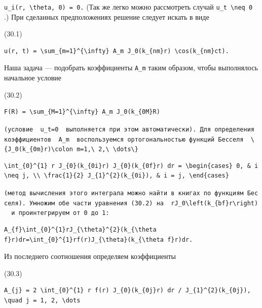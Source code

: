 \documentclass[
  ukrainian,
]{article}
\begin{document}
\texttt{u\_i(r,\ \textbackslash{}theta,\ 0)\ =\ 0.} (Так же легко можно
рассмотреть случай \texttt{u\_t\ \textbackslash{}neq\ 0} .) При
сделанных предположениях решение следует искать в виде

(30.1)

\begin{verbatim}
u(r, t) = \sum_{m=1}^{\infty} A_m J_0(k_{nm}r) \cos(k_{nm}ct).
\end{verbatim}

Наша задача --- подобрать коэффициенты \texttt{A\_m} таким образом,
чтобы выполнялось начальное условие

(30.2)

\begin{verbatim}
F(R) = \sum_{M=1}^{\infty} A_m J_0(k_{0M}R)
\end{verbatim}

\texttt{(условие\ \ \textquotesingle{}u\_t=0\textquotesingle{}\ \ выполняется\ при\ этом\ автоматически).\ Для\ определения\ коэффициентов\ \ \textquotesingle{}A\_m\textquotesingle{}\ \ воспользуемся\ ортогональностью\ функций\ Бесселя\ \ \textquotesingle{}\textbackslash{}\{J\_0(k\_\{0m\}r)\textbackslash{}colon\ m=1,\textbackslash{}\ 2,\textbackslash{}\ \textbackslash{}dots\textbackslash{}\}\textquotesingle{}}

\begin{verbatim}
\int_{0}^{1} r J_{0}(k_{0i}r) J_{0}(k_{0f}r) dr = \begin{cases} 0, & i \neq j, \\ \frac{1}{2} J_{1}^{2}(k_{0i}), & i = j, \end{cases}
\end{verbatim}

\texttt{(метод\ вычисления\ этого\ интеграла\ можно\ найти\ в\ книгах\ по\ функциям\ Бесселя).\ Умножим\ обе\ части\ уравнения\ (30.2)\ на\ \ \textquotesingle{}rJ\_0\textbackslash{}left(k\_\{bf\}r\textbackslash{}right)\textquotesingle{}\ \ и\ проинтегрируем\ от\ 0\ до\ 1:}

\begin{verbatim}
A_{f}\int_{0}^{1}rJ_{\theta}^{2}(k_{\theta f}r)dr=\int_{0}^{1}rf(r)J_{\theta}(k_{\theta f}r)dr.
\end{verbatim}

Из последнего соотношения определяем коэффициенты

(30.3)

\begin{verbatim}
A_{j} = 2 \int_{0}^{1} r f(r) J_{0}(k_{0j}r) dr / J_{1}^{2}(k_{0j}), \quad j = 1, 2, \dots
\end{verbatim}
\end{document}

